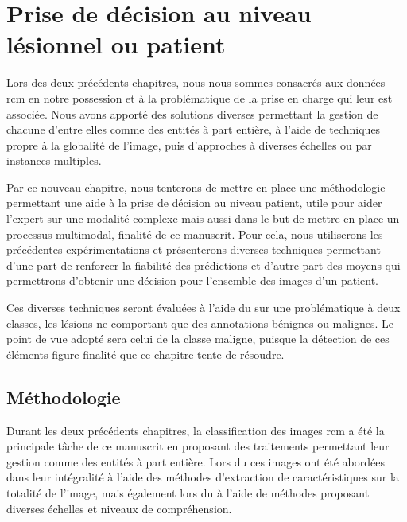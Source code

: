 \chapter{Prise de décision au niveau lésionnel ou patient}
\label{chap:chapter_6}
\chapterintro
Lors des deux précédents chapitres, nous nous sommes consacrés aux données \gls{rcm} en notre possession et à la problématique de la prise en charge qui leur est associée. Nous avons apporté des solutions diverses permettant la gestion de chacune d'entre elles comme des entités à part entière, à l'aide de techniques propre à la globalité de l'image, puis d'approches à diverses échelles ou par instances multiples.\par

Par ce nouveau chapitre, nous tenterons de mettre en place une méthodologie permettant une aide à la prise de décision au niveau patient, utile pour aider l'expert sur une modalité complexe mais aussi dans le but de mettre en place un processus multimodal, finalité de ce manuscrit. Pour cela, nous utiliserons les précédentes expérimentations et présenterons diverses techniques permettant d'une part de renforcer la fiabilité des prédictions et d'autre part des moyens qui permettrons d'obtenir une décision pour l'ensemble des images d'un patient.\par

Ces diverses techniques seront évaluées à l'aide du \fscore{} sur une problématique à deux classes, les lésions ne comportant que des annotations bénignes ou malignes. Le point de vue adopté sera celui de la classe maligne, puisque la détection de ces éléments figure finalité que ce chapitre tente de résoudre.\par

\newpage

\section{Méthodologie}
\label{sec:patient_decision_methodology}
Durant les deux précédents chapitres, la classification des images \gls{rcm} a été la principale tâche de ce manuscrit en proposant des traitements permettant leur gestion comme des entités à part entière. Lors du  ces images ont été abordées dans leur intégralité à l'aide des méthodes d'extraction de caractéristiques sur la totalité de l'image, mais également lors du  à l'aide de méthodes proposant diverses échelles et niveaux de compréhension.\par

